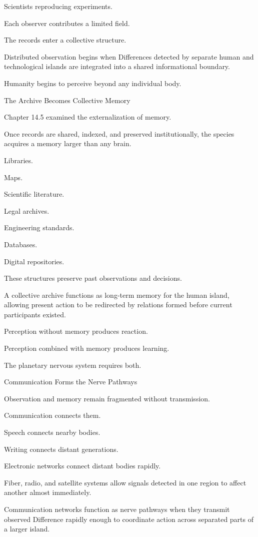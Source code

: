 Scientists reproducing experiments.

Each observer contributes a limited field.

The records enter a collective structure.

Distributed observation begins when Differences detected by separate human and technological islands are integrated into a shared informational boundary.

Humanity begins to perceive beyond any individual body.

The Archive Becomes Collective Memory

Chapter 14.5 examined the externalization of memory.

Once records are shared, indexed, and preserved institutionally, the species acquires a memory larger than any brain.

Libraries.

Maps.

Scientific literature.

Legal archives.

Engineering standards.

Databases.

Digital repositories.

These structures preserve past observations and decisions.

A collective archive functions as long-term memory for the human island, allowing present action to be redirected by relations formed before current participants existed.

Perception without memory produces reaction.

Perception combined with memory produces learning.

The planetary nervous system requires both.

Communication Forms the Nerve Pathways

Observation and memory remain fragmented without transmission.

Communication connects them.

Speech connects nearby bodies.

Writing connects distant generations.

Electronic networks connect distant bodies rapidly.

Fiber, radio, and satellite systems allow signals detected in one region to affect another almost immediately.

Communication networks function as nerve pathways when they transmit observed Difference rapidly enough to coordinate action across separated parts of a larger island.

